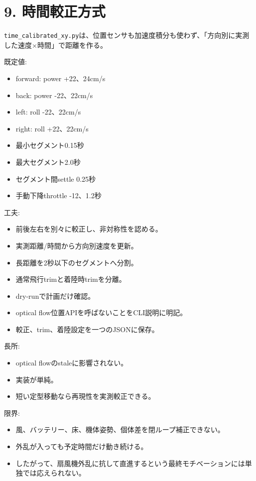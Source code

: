 \documentclass[10pt,a4paper,openany]{ltjsbook}
\begin{document}
\chapter{9. 時間較正方式}
\texttt{time\_calibrated\_xy.py}は、位置センサも加速度積分も使わず、「方向別に実測した速度×時間」で距離を作る。\par
既定値:\par
\begin{itemize}
\item forward: power +22、24cm/s
\item back: power -22、22cm/s
\item left: roll -22、22cm/s
\item right: roll +22、22cm/s
\item 最小セグメント0.15秒
\item 最大セグメント2.0秒
\item セグメント間settle 0.25秒
\item 手動下降throttle -12、1.2秒
\end{itemize}
工夫:\par
\begin{itemize}
\item 前後左右を別々に較正し、非対称性を認める。
\item 実測距離/時間から方向別速度を更新。
\item 長距離を2秒以下のセグメントへ分割。
\item 通常飛行trimと着陸時trimを分離。
\item dry-runで計画だけ確認。
\item optical flow位置APIを呼ばないことをCLI説明に明記。
\item 較正、trim、着陸設定を一つのJSONに保存。
\end{itemize}
長所:\par
\begin{itemize}
\item optical flowのstaleに影響されない。
\item 実装が単純。
\item 短い定型移動なら再現性を実測較正できる。
\end{itemize}
限界:\par
\begin{itemize}
\item 風、バッテリー、床、機体姿勢、個体差を閉ループ補正できない。
\item 外乱が入っても予定時間だけ動き続ける。
\item したがって、扇風機外乱に抗して直進するという最終モチベーションには単独では応えられない。
\end{itemize}
\vspace{0.3em}{\noindent\color{ReportLight}\rule{\linewidth}{0.8pt}}\vspace{0.3em}
\end{document}
